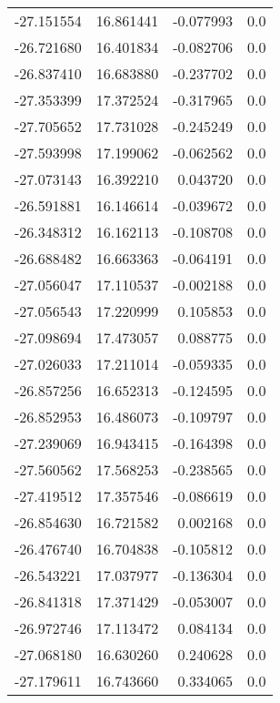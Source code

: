 \begin{tabular}{rrrr}
      -27.151554 &        16.861441 &   -0.077993 &   0.0 \\
      -26.721680 &        16.401834 &   -0.082706 &   0.0 \\
      -26.837410 &        16.683880 &   -0.237702 &   0.0 \\
      -27.353399 &        17.372524 &   -0.317965 &   0.0 \\
      -27.705652 &        17.731028 &   -0.245249 &   0.0 \\
      -27.593998 &        17.199062 &   -0.062562 &   0.0 \\
      -27.073143 &        16.392210 &    0.043720 &   0.0 \\
      -26.591881 &        16.146614 &   -0.039672 &   0.0 \\
      -26.348312 &        16.162113 &   -0.108708 &   0.0 \\
      -26.688482 &        16.663363 &   -0.064191 &   0.0 \\
      -27.056047 &        17.110537 &   -0.002188 &   0.0 \\
      -27.056543 &        17.220999 &    0.105853 &   0.0 \\
      -27.098694 &        17.473057 &    0.088775 &   0.0 \\
      -27.026033 &        17.211014 &   -0.059335 &   0.0 \\
      -26.857256 &        16.652313 &   -0.124595 &   0.0 \\
      -26.852953 &        16.486073 &   -0.109797 &   0.0 \\
      -27.239069 &        16.943415 &   -0.164398 &   0.0 \\
      -27.560562 &        17.568253 &   -0.238565 &   0.0 \\
      -27.419512 &        17.357546 &   -0.086619 &   0.0 \\
      -26.854630 &        16.721582 &    0.002168 &   0.0 \\
      -26.476740 &        16.704838 &   -0.105812 &   0.0 \\
      -26.543221 &        17.037977 &   -0.136304 &   0.0 \\
      -26.841318 &        17.371429 &   -0.053007 &   0.0 \\
      -26.972746 &        17.113472 &    0.084134 &   0.0 \\
      -27.068180 &        16.630260 &    0.240628 &   0.0 \\
      -27.179611 &        16.743660 &    0.334065 &   0.0 \\

\end{tabular}
